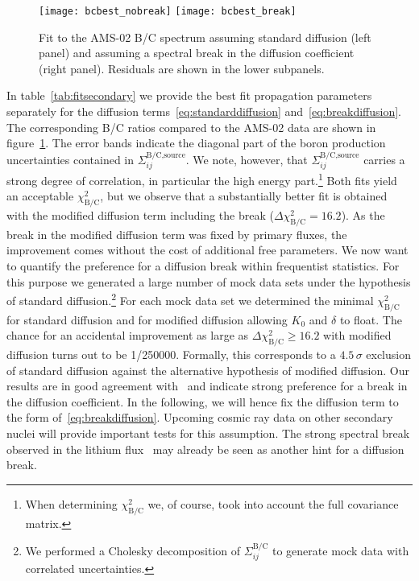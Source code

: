 \documentclass[a4paper,11pt]{article}
\begin{document}
\begin{figure}[htp]
\begin{center}
  \texttt{[image: bcbest\_nobreak]}\hspace{3mm}
  \texttt{[image: bcbest\_break]}\\
\end{center}
\caption{Fit to the AMS-02 B/C spectrum assuming standard diffusion (left panel) and assuming a spectral break in the diffusion coefficient (right panel). Residuals are shown in the lower subpanels.}
\label{fig:bc}
\end{figure}

In table~\ref{tab:fitsecondary} we provide the best fit propagation parameters separately for the diffusion terms~\eqref{eq:standarddiffusion} and~\eqref{eq:breakdiffusion}. The corresponding B/C ratios compared to the AMS-02 data are shown in figure~\ref{fig:bc}. The error bands indicate the diagonal part of the boron production uncertainties contained in $\Sigma_{ij}^\text{B/C,source}$. We note, however, that $\Sigma_{ij}^\text{B/C,source}$ carries a strong degree of correlation, in particular the high energy part.\footnote{When determining $\chi^2_{\text{B/C}}$ we, of course, took into account the full covariance matrix.} Both fits yield an acceptable $\chi^2_{\text{B/C}}$, but we observe that a substantially better fit is obtained with the modified diffusion term including the break ($\Delta\chi^2_{\text{B/C}} =16.2$). As the break in the modified diffusion term was fixed by primary fluxes, the improvement comes without the cost of additional free parameters. We now want to quantify the preference for a diffusion break within frequentist statistics. For this purpose we generated a large number of mock data sets under the hypothesis of standard diffusion.\footnote{We performed a Cholesky decomposition of $\Sigma_{ij}^\text{B/C}$ to generate mock data with correlated uncertainties.} For each mock data set we determined the minimal $\chi^2_{\text{B/C}}$ for standard diffusion and for modified diffusion allowing $K_0$ and $\delta$ to float. 
The chance for an accidental improvement as large as $\Delta\chi^2_{\text{B/C}} \geq 16.2$ with modified diffusion turns out to be 1/250000.
Formally, this corresponds to a $4.5\,\sigma$ exclusion of standard diffusion against the alternative hypothesis of modified diffusion. Our results are in good agreement with~\cite{Genolini:2017dfb} and indicate strong preference for a break in the diffusion coefficient. In the following, we will hence fix the diffusion term to the form of~\eqref{eq:breakdiffusion}. Upcoming cosmic ray data on other secondary nuclei will provide important tests for this assumption. The strong spectral break observed in the lithium flux~\cite{talkXSCR} may already be seen as another hint for a diffusion break.
\end{document}
